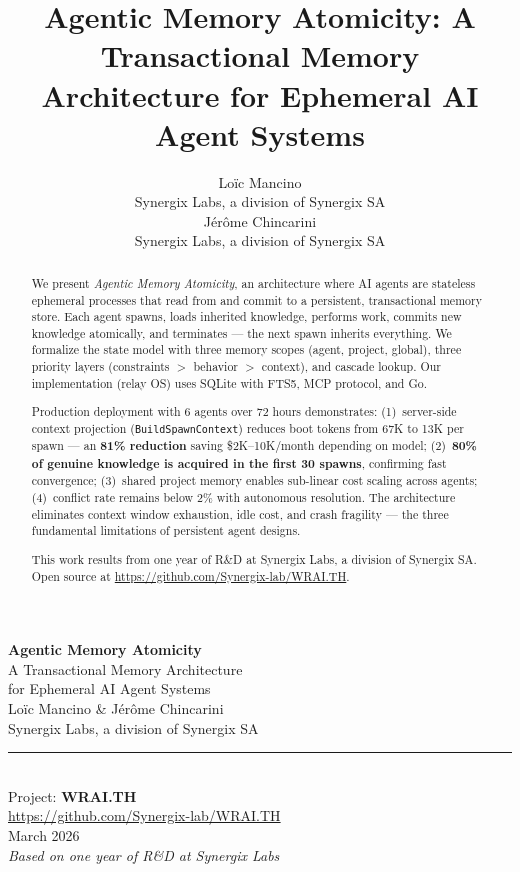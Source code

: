 \documentclass{article}
\title{Agentic Memory Atomicity: A Transactional Memory Architecture for Ephemeral AI Agent Systems}
\author{
  Lo\"ic Mancino \\
  Synergix Labs, a division of Synergix SA \\
  \And
  J\'er\^ome Chincarini \\
  Synergix Labs, a division of Synergix SA
}
\date{}
\begin{document}
\thispagestyle{empty}
\vspace*{\fill}
\begin{center}
{\Huge\textbf{Agentic Memory Atomicity}}\\[12pt]
{\Large A Transactional Memory Architecture\\for Ephemeral AI Agent Systems}\\[40pt]
{\large Lo\"ic Mancino \quad \& \quad J\'er\^ome Chincarini}\\[8pt]
{\normalsize Synergix Labs, a division of Synergix SA}\\[30pt]
\rule{0.4\textwidth}{0.5pt}\\[20pt]
{\normalsize Project: \textbf{WRAI.TH}}\\[6pt]
{\small \url{https://github.com/Synergix-lab/WRAI.TH}}\\[30pt]
{\small March 2026}\\[8pt]
{\small\itshape Based on one year of R\&D at Synergix Labs}
\end{center}
\vspace*{\fill}
\newpage

\maketitle

\begin{abstract}
We present \emph{Agentic Memory Atomicity}, an architecture where AI agents are stateless ephemeral processes that read from and commit to a persistent, transactional memory store. Each agent spawns, loads inherited knowledge, performs work, commits new knowledge atomically, and terminates --- the next spawn inherits everything. We formalize the state model with three memory scopes (agent, project, global), three priority layers (constraints $>$ behavior $>$ context), and cascade lookup. Our implementation (relay OS) uses SQLite with FTS5, MCP protocol, and Go.

Production deployment with 6 agents over 72 hours demonstrates: (1)~server-side context projection (\texttt{BuildSpawnContext}) reduces boot tokens from 67K to 13K per spawn --- an \textbf{81\% reduction} saving \$2K--10K/month depending on model; (2)~\textbf{80\% of genuine knowledge is acquired in the first 30 spawns}, confirming fast convergence; (3)~shared project memory enables sub-linear cost scaling across agents; (4)~conflict rate remains below 2\% with autonomous resolution. The architecture eliminates context window exhaustion, idle cost, and crash fragility --- the three fundamental limitations of persistent agent designs.

This work results from one year of R\&D at Synergix Labs, a division of Synergix SA. Open source at \url{https://github.com/Synergix-lab/WRAI.TH}.
\end{abstract}
\end{document}
